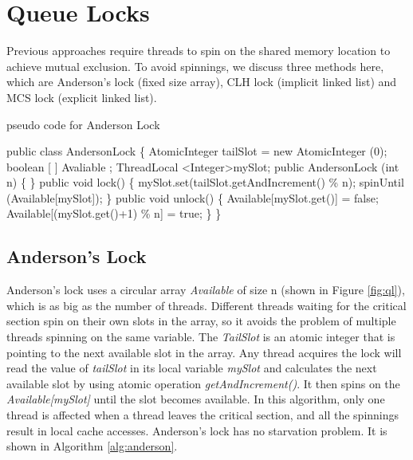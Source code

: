 \documentclass[twoside]{article}
\begin{document}
\section{Queue Locks}
Previous approaches require threads to spin on the shared memory location to achieve mutual exclusion. To avoid spinnings, we discuss three methods here, which are Anderson's lock (fixed size array), CLH lock (implicit linked list) and MCS lock (explicit linked list). 

\begin{algorithm}
\caption{pseudo code for Anderson Lock}
\begin{algorithmic}[1]
\State public class AndersonLock \{
\State \indent AtomicInteger tailSlot = new AtomicInteger (0); 
\State \indent boolean [ ] Avaliable ;
\State \indent ThreadLocal \textless Integer\textgreater mySlot;  \newline
\State \indent public AndersonLock (int n) \{ 
\State \indent \} 
\State \indent public void lock() \{
\State \indent \indent mySlot.set(tailSlot.getAndIncrement() \% n);
\State \indent \indent spinUntil (Available[mySlot]);
\State \indent \}
\State \indent public void unlock() \{
\State \indent \indent Available[mySlot.get()] = false;
\State \indent \indent Available[(mySlot.get()+1) \% n] = true;
\State \indent \}
\State \}
\end{algorithmic}
\label{alg:anderson}
\end{algorithm}

\subsection{Anderson's Lock}
Anderson's lock uses a circular array \textit{Available} of size n (shown in Figure \ref{fig:ql}), which is as big as the number of threads. Different threads waiting for the critical section spin on their own slots in the array, so it avoids the problem of multiple threads spinning on the same variable. The \textit{TailSlot} is an atomic integer that is pointing to the next available slot in the array. Any thread acquires the lock will read the value of \textit{tailSlot} in its local variable \textit{mySlot} and calculates the next available slot by using atomic operation \textit{getAndIncrement()}. It then spins on the \textit{Available[mySlot]} until the slot becomes available. In this algorithm, only one thread is affected when a thread leaves the critical section, and all the spinnings result in local cache accesses. Anderson's lock has no starvation problem. It is shown in Algorithm \ref{alg:anderson}. 
\end{document}
